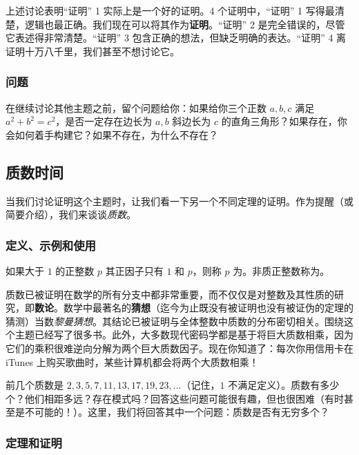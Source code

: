 上述讨论表明``证明'' 1 实际上是一个好的证明。4 个证明中，``证明'' 1 写得最清楚，逻辑也最正确。我们现在可以将其作为\textbf{证明}。``证明'' 2 是完全错误的，尽管它表述得非常清楚。``证明'' 3 包含正确的想法，但缺乏明确的表达。``证明'' 4 离证明十万八千里，我们甚至不想讨论它。

\subsubsection*{问题}

在继续讨论其他主题之前，留个问题给你：如果给你三个正数 $a,b,c$ 满足 $a^2+b^2=c^2$，是否一定存在边长为 $a,b$ 斜边长为 $c$ 的直角三角形？如果存在，你会如何着手构建它？如果不存在，为什么不存在？

\subsection{质数时间}\label{sec:section1.1.2}

当我们讨论证明这个主题时，让我们看一下另一个不同定理的证明。作为提醒（或简要介绍），我们来谈谈\emph{质数}。

\subsubsection*{定义、示例和使用}

\begin{definition}\label{def:prime}
    如果大于 $1$ 的正整数 $p$ 其正因子只有 $1$ 和 $p$，则称 $p$ 为。非质正整数称为。
\end{definition}

质数已被证明在数学的所有分支中都非常重要，而不仅仅是对整数及其性质的研究，即\textbf{数论}。数学中最著名的\textbf{猜想}（迄今为止既没有被证明也没有被证伪的定理的猜测）当数\emph{黎曼猜想}。其结论已被证明与全体整数中质数的分布密切相关。围绕这个主题已经写了很多书。此外，大多数现代密码学都是基于将巨大质数相乘，因为它们的乘积很难逆向分解为两个巨大质数因子。现在你知道了：每次你用信用卡在 iTunes 上购买歌曲时，某些计算机都会将两个大质数相乘！

前几个质数是 $2, 3, 5, 7, 11, 13, 17, 19, 23,\dots$（记住，$1$ 不满足定义）。质数有多少个？他们相距多远？存在模式吗？回答这些问题可能很有趣，但也很困难（有时甚至是不可能的！）。这里，我们将回答其中一个问题：质数是否有无穷多个？

\subsubsection*{定理和证明}

